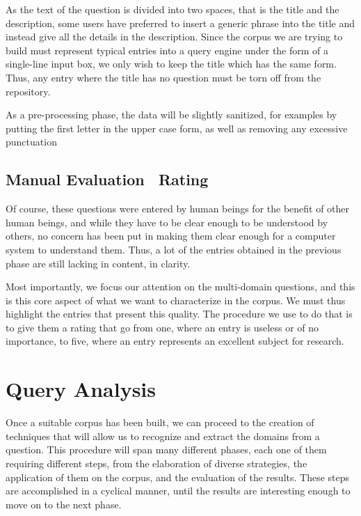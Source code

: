 As the text of the question is divided into two spaces, that is the title and the description, some users have preferred to insert a generic phrase into the title and instead give all the details in the description. Since the corpus we are trying to build must represent typical entries into a query engine under the form of a single-line input box, we only wish to keep the title which has the same form. Thus, any entry where the title has no question must be torn off from the repository.

As a pre-processing phase, the data will be slightly sanitized, for examples by putting the first letter in the upper case form, as well as removing any excessive punctuation


\subsection{Manual Evaluation \amper\ Rating} %
\label{sub:entry_filtering_rating}

Of course, these questions were entered by human beings for the benefit of other human beings, and while they have to be clear enough to be understood by others, no concern has been put in making them clear enough for a computer system to understand them. Thus, a lot of the entries obtained in the previous phase are still lacking in content, in clarity.

Most importantly, we focus our attention on the multi-domain questions, and this is this core aspect of what we want to characterize in the corpus. We must thus highlight the entries that present this quality. The procedure we use to do that is to give them a rating that go from one, where an entry is useless or of no importance, to five, where an entry represents an excellent subject for research.



\section{Query Analysis} %
\label{sec:query_analysis_spec}

Once a suitable corpus has been built, we can proceed to the creation of techniques that will allow us to recognize and extract the domains from a question. This procedure will span many different phases, each one of them requiring different steps, from the elaboration of diverse strategies, the application of them on the corpus, and the evaluation of the results. These steps are accomplished in a cyclical manner, until the results are interesting enough to move on to the next phase.

